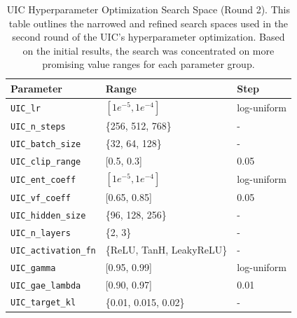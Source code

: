 \begin{table}[!htb]
    \centering
    \begin{tabular}{lll}
        \toprule
        \textbf{Parameter} & \textbf{Range} & \textbf{Step} \\
        \midrule
        \texttt{UIC\_lr}                & $[1e^{-5}, 1e^{-4}]$      & log-uniform \\
        \texttt{UIC\_n\_steps}          & \{256, 512, 768\}         & - \\
        \texttt{UIC\_batch\_size}       & \{32, 64, 128\}           & - \\
        \texttt{UIC\_clip\_range}       & [0.5, 0.3]                & 0.05 \\
        \texttt{UIC\_ent\_coeff}        & $[1e^{-5}, 1e^{-4}]$      & log-uniform \\
        \texttt{UIC\_vf\_coeff}         & [0.65, 0.85]              & 0.05 \\
        \midrule
        \texttt{UIC\_hidden\_size}      & \{96, 128, 256\}          & - \\
        \texttt{UIC\_n\_layers}         & \{2, 3\}                  & - \\
        \texttt{UIC\_activation\_fn}    & \{ReLU, TanH, LeakyReLU\} & - \\
        \midrule
        \texttt{UIC\_gamma}             & [0.95, 0.99]              & log-uniform \\
        \texttt{UIC\_gae\_lambda}       & [0.90, 0.97]              & 0.01\\
        \texttt{UIC\_target\_kl}        & \{0.01, 0.015, 0.02\}     & -\\
        \bottomrule
    \end{tabular}
    \caption{UIC Hyperparameter Optimization Search Space (Round 2). This table outlines the narrowed and refined search spaces used in the second round of the UIC's hyperparameter optimization. Based on the initial results, the search was concentrated on more promising value ranges for each parameter group.}
    \label{tab:uic_ho_second_round}
\end{table}

